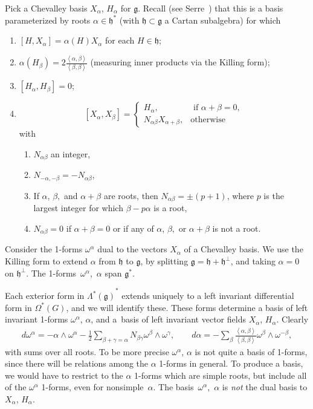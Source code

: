 \documentclass[pdftex]{sigma}
\newcommand{\Lm}[2]{\ensuremath{\Lambda^{#1} \left ( {#2} \right )}}
\newcommand{\nForms}[2]{\ensuremath{\Omega^{#1} \left ( {#2} \right
    )}}
\newcommand{\LieG}{\ensuremath{\mathfrak{g}}}
\newcommand{\Gtot}{\ensuremath{G}}
\newcommand{\gtot}{\mathfrak{g}}
\newcommand{\cartan}{\ensuremath{\mathfrak{h}}}
\begin{document}
Pick a Chevalley basis $X_{\alpha}$, $H_{\alpha}$
for $\LieG$. Recall (see Serre~\cite{Serre:2001}) that this is a basis
parameterized by roots $\alpha \in \cartan^*$
(with $\cartan \subset \gtot$ a Cartan
subalgebra) for which
\begin{enumerate}\itemsep=0pt
\item $\left[H,X_{\alpha}\right]=\alpha(H) X_{\alpha}$
for each $H \in \cartan$;
\item $\alpha\left(H_{\beta}\right)=
2 \frac{\left<\alpha, \beta\right>}{\left<\beta,\beta\right>}$
(measuring inner products via the Killing form);
\item $\left[H_{\alpha},H_{\beta}\right]=0$;
\item
\[
\left[X_{\alpha},X_{\beta}\right]=
\begin{cases}
H_{\alpha}, & \text{ if } \alpha+\beta=0, \\
N_{\alpha\beta} X_{\alpha+\beta}, & \text{otherwise}
\end{cases}
\]
with
\begin{enumerate}\itemsep=0pt
\item $N_{\alpha\beta}$ an integer,
\item $N_{-\alpha,-\beta}=-N_{\alpha\beta}$,
\item If $\alpha$, $\beta, $ and $\alpha+\beta$ are roots, then
$N_{\alpha\beta}=\pm (p+1)$,
where $p$ is the largest integer for which $\beta-p  \alpha$ is a root,
\item
$N_{\alpha \beta}=0$ if $\alpha+\beta = 0$ or
if any of $\alpha$, $\beta,$ or  $\alpha+\beta$ is not a root.
\end{enumerate}
\end{enumerate}

Consider the 1-forms $\omega^{\alpha}$ dual to the vectors
$X_{\alpha}$ of a Chevalley basis. We use the Killing form to extend $\alpha$ from $\cartan$ to $\gtot$,
by splitting $\gtot = \cartan + \cartan^{\perp}$,
and taking $\alpha=0$ on $\cartan^{\perp}$. The 1-forms~$\omega^{\alpha}$,~$\alpha$
span $\gtot^*$.

Each exterior form in $\Lm{*}{\gtot}^*$ extends uniquely to
a left invariant dif\/ferential form in $\nForms{*}{\Gtot}$, and we will
identify these. These forms determine a basis of left invariant 1-forms
$\omega^{\alpha}$, $\alpha$, and a~basis of left invariant vector
f\/ields $X_{\alpha}$, $H_{\alpha}$. Clearly
\begin{gather*}
d \omega^{\alpha}  = - \alpha \wedge \omega^{\alpha} - \frac{1}{2}
\sum_{\beta + \gamma=\alpha} N_{\beta \gamma} \omega^{\beta} \wedge \omega^{\gamma}, \qquad
d \alpha  =
-
\sum_{\beta} \frac{\left<\alpha,\beta\right>}
{\left<\beta,\beta\right>} \omega^{\beta} \wedge \omega^{-\beta},
\end{gather*}
with sums over all roots.
To be more precise $\omega^{\alpha}$, $\alpha$ is not quite a basis of 1-forms,
since there will be relations among the $\alpha$ 1-forms
in general. To produce a basis, we would have to restrict
to the $\alpha$ 1-forms which are simple roots, but
include all of the $\omega^{\alpha}$ 1-forms,
even for nonsimple~$\alpha$. The basis~$\omega^{\alpha}$,~$\alpha$
is \emph{not} the dual basis to $X_{\alpha}$, $H_{\alpha}$.
\end{document}
